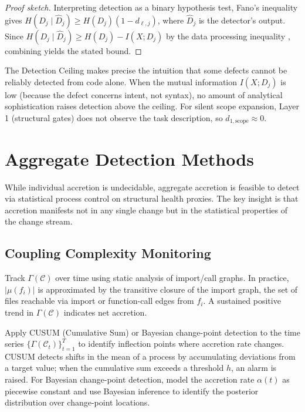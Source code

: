 \documentclass[11pt, a4paper, copyright]{googledeepmind}
\begin{document}
\begin{proof}[Proof sketch]
Interpreting detection as a binary hypothesis test, Fano's inequality gives $H(D_j \mid \hat{D}_j) \geq H(D_j)(1 - d_{\ell,j})$, where $\hat{D}_j$ is the detector's output. Since $H(D_j \mid \hat{D}_j) \geq H(D_j) - I(X; D_j)$ by the data processing inequality \citep{cover2006}, combining yields the stated bound.
\end{proof}

The Detection Ceiling makes precise the intuition that some defects cannot be reliably detected from code alone. When the mutual information $I(X; D_j)$ is low (because the defect concerns intent, not syntax), no amount of analytical sophistication raises detection above the ceiling. For silent scope expansion, Layer 1 (structural gates) does not observe the task description, so $d_{1,\text{scope}} \approx 0$.


\section{Aggregate Detection Methods}
\label{sec:aggregate}

While individual accretion is undecidable, aggregate accretion is feasible to detect via statistical process control on structural health proxies. The key insight is that accretion manifests not in any single change but in the statistical properties of the change stream.

\subsection{Coupling Complexity Monitoring}

Track $\Gamma(\mathcal{C})$ over time using static analysis of import/call graphs. In practice, $|\mu(f_i)|$ is approximated by the transitive closure of the import graph, the set of files reachable via import or function-call edges from $f_i$. A sustained positive trend in $\Gamma(\mathcal{C})$ indicates net accretion.

Apply CUSUM (Cumulative Sum) or Bayesian change-point detection to the time series $\{\Gamma(\mathcal{C}_t)\}_{t=1}^T$ to identify inflection points where accretion rate changes. CUSUM detects shifts in the mean of a process by accumulating deviations from a target value; when the cumulative sum exceeds a threshold $h$, an alarm is raised. For Bayesian change-point detection, model the accretion rate $\alpha(t)$ as piecewise constant and use Bayesian inference to identify the posterior distribution over change-point locations.
\end{document}
